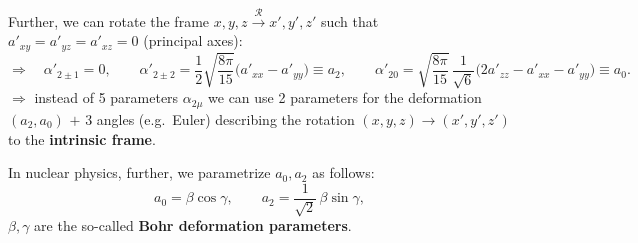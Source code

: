 \documentclass[11pt,a4paper]{article}
\begin{document}
Further, we can rotate the frame $x,y,z\xrightarrow{\ \mathcal R\ }x',y',z'$ such that $a'_{xy}=a'_{yz}=a'_{xz}=0$ (principal axes):
\[
\Rightarrow\quad \alpha'_{2\pm1}=0,\qquad
\alpha'_{2\pm2}=\frac12\sqrt{\frac{8\pi}{15}}\big(a'_{xx}-a'_{yy}\big)\equiv a_2,\qquad
\alpha'_{20}=\sqrt{\frac{8\pi}{15}}\,\frac{1}{\sqrt6}\big(2a'_{zz}-a'_{xx}-a'_{yy}\big)\equiv a_0 .
\]
$\Rightarrow$ instead of 5 parameters $\alpha_{2\mu}$ we can use 2 parameters for the deformation $(a_2,a_0)$ $+$ 3 angles (e.g.\ Euler) describing the rotation $(x,y,z)\to(x',y',z')$ to the \textbf{intrinsic frame}.

In nuclear physics, further, we parametrize $a_0,a_2$ as follows:
\[
a_0=\beta\cos\gamma,\qquad a_2=\frac{1}{\sqrt2}\,\beta\sin\gamma ,
\]
$\beta,\gamma$ are the so-called \textbf{Bohr deformation parameters}.
\end{document}
